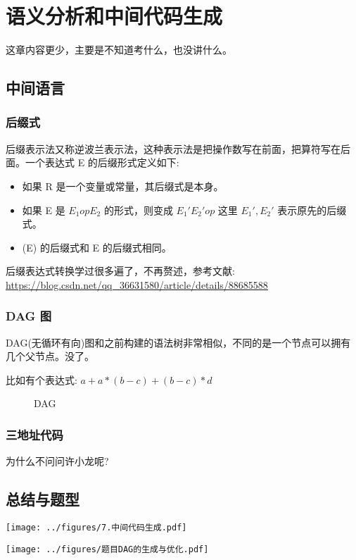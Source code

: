\section{语义分析和中间代码生成}

这章内容更少，主要是不知道考什么，也没讲什么。

\subsection{中间语言}
\subsubsection{后缀式}

后缀表示法又称逆波兰表示法，这种表示法是把操作数写在前面，把算符写在后面。一个表达式 E 的后缀形式定义如下:
\begin{itemize}
    \item 如果 R 是一个变量或常量，其后缀式是本身。
    \item 如果 E 是 $E_1 op E_2$ 的形式，则变成 $E_1'E_2'op$ 这里 $E_1',E_2'$ 表示原先的后缀式。
    \item (E) 的后缀式和 E 的后缀式相同。
\end{itemize}

后缀表达式转换学过很多遍了，不再赘述，参考文献: \url{https://blog.csdn.net/qq_36631580/article/details/88685588}

\subsubsection{DAG 图}
DAG(无循环有向)图和之前构建的语法树非常相似，不同的是一个节点可以拥有几个父节点。没了。

比如有个表达式: $a+a*(b-c)+(b-c)*d$

\begin{figure}[H]
    \centering
    \caption{DAG}
    \label{fig:DAG}
\end{figure}

\subsubsection{三地址代码}
为什么不问问许小龙呢?

\subsection{总结与题型}

\texttt{[image: ../figures/7.中间代码生成.pdf]}

\texttt{[image: ../figures/题目DAG的生成与优化.pdf]}